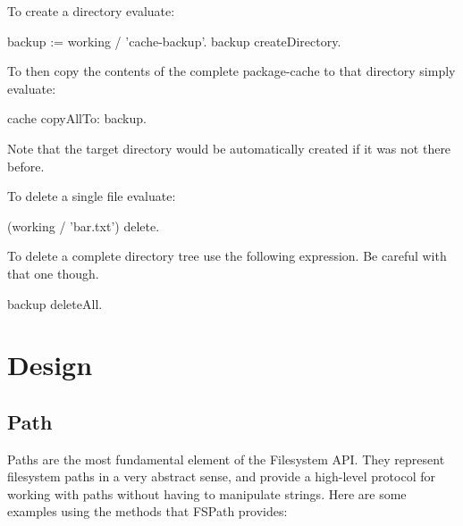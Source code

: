 \documentclass[a4paper,10pt,twoside]{book}
\begin{document}
To create a directory evaluate:
\begin{code}{}
 backup := working / 'cache-backup'.
 backup createDirectory.
\end{code} 

To then copy the contents of the complete package-cache to that directory simply evaluate:

\begin{code}{}
 cache copyAllTo: backup.
\end{code}

Note that the target directory would be automatically created if it was not there before.

To delete a single file evaluate:

\begin{code}{}
 (working / 'bar.txt') delete.
\end{code}

To delete a complete directory tree use the following expression. Be careful with that one though.

\begin{code}
 backup deleteAll.
\end{code}


\section{Design }

\subsection{Path}

Paths are the most fundamental element of the Filesystem API. They represent filesystem paths in a very abstract sense, and provide a high-level protocol for working with paths without having to manipulate strings. Here are some examples using the methods that FSPath provides:
\end{document}
